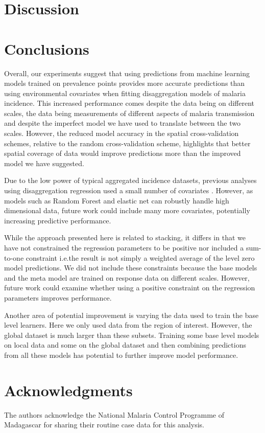 \documentclass[11pt]{article}
\begin{document}
\section{Discussion}

\section{Conclusions}

Overall, our experiments suggest that using predictions from machine learning models trained on prevalence points provides more accurate predictions than using environmental covariates when fitting disaggregation models of malaria incidence.
This increased performance comes despite the data being on different scales, the data being measurements of different aspects of malaria transmission and despite the imperfect model we have used to translate between the two scales.
However, the reduced model accuracy in the spatial cross-validation schemes, relative to the random cross-validation scheme, highlights that better spatial coverage of data would improve predictions more than the improved model we have suggested.

Due to the low power of typical aggregated incidence datasets, previous analyses using disaggregation regression used a small number of covariates \citep{sturrock2014fine}.
However, as models such as Random Forest and elastic net can robustly handle high dimensional data, future work could include many more covariates, potentially increasing predictive performance.




While the approach presented here is related to stacking, it differs in that we have not constrained the regression parameters to be positive nor included a sum-to-one constraint i.e.\thinspace the result is not simply a weighted average of the level zero model predictions.
We did not include these constraints because the base models and the meta model are trained on response data on different scales.
However, future work could examine whether using a positive constraint on the regression parameters improves performance.

Another area of potential improvement is varying the data used to train the base level learners.
Here we only used data from the region of interest.
However, the global dataset is much larger than these subsets.
Training some base level models on local data and some on the global dataset and then combining predictions from all these models has potential to further improve model performance.

\section*{Acknowledgments}
The authors acknowledge the National Malaria Control Programme of Madagascar for sharing their routine case data for this analysis.

 

\end{document}
